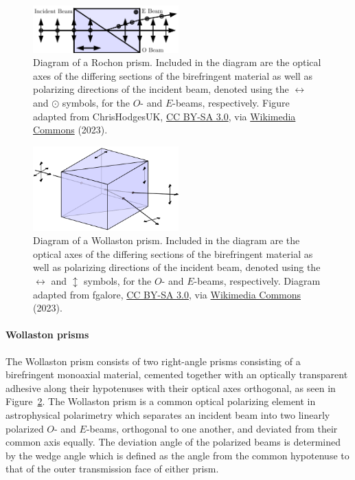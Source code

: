 \begin{figure}[t]
    \centering
    \includegraphics[width=0.5\textwidth]{figures/2_rochon.pdf}
    \caption{Diagram of a Rochon prism. Included in the diagram are the optical axes of the differing sections of the birefringent material as well as polarizing directions of the incident beam, denoted using the $\leftrightarrow$ and $\odot$ symbols, for the $O$- and $E$-beams, respectively. Figure adapted from ChrisHodgesUK, \protect\href{https://creativecommons.org/licenses/by-sa/3.0/}{CC BY-SA 3.0}, via \protect\href{https://commons.wikimedia.org/wiki/File:Rochon_Prism.svg}{Wikimedia Commons} (2023).}
    \label{fig:Rochon_prism}
\end{figure}

\begin{figure}[t]
    \centering
    \includegraphics[width=0.5\textwidth]{figures/2_wollaston.pdf}
    \caption{Diagram of a Wollaston prism. Included in the diagram are the optical axes of the differing sections of the birefringent material as well as polarizing directions of the incident beam, denoted using the $\leftrightarrow$ and $\updownarrow$ symbols, for the $O$- and $E$-beams, respectively. Diagram adapted from fgalore, \protect\href{https://creativecommons.org/licenses/by-sa/3.0/}{CC BY-SA 3.0}, via \protect\href{https://commons.wikimedia.org/wiki/File:Wollaston-prism.svg}{Wikimedia Commons} (2023).}
    \label{fig:Wollaston_prism}
\end{figure}

\paragraph{Wollaston prisms}
The Wollaston prism consists of two right-angle prisms consisting of a birefringent monoaxial material, cemented together with an optically transparent adhesive along their hypotenuses with their optical axes orthogonal, as seen in Figure~\ref{fig:Wollaston_prism}. The Wollaston prism is a common optical polarizing element in astrophysical polarimetry which separates an incident beam into two linearly polarized $O$- and $E$-beams, orthogonal to one another, and deviated from their common axis equally. The deviation angle of the polarized beams is determined by the wedge angle which is defined as the angle from the common hypotenuse to that of the outer transmission face of either prism.

